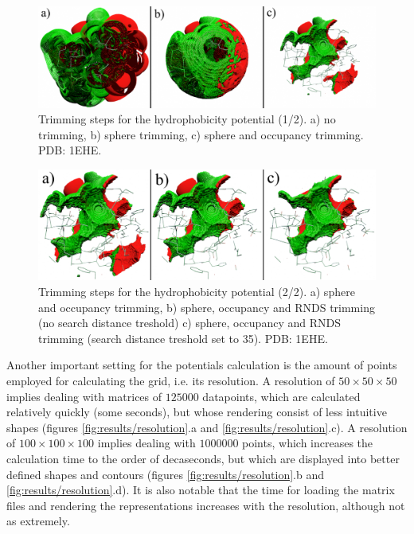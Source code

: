     \begin{figure}[H]
      \centering
      \includegraphics[width=1\textwidth]{figures/results/trimming_0.png}
      \caption{\label{fig:results/trimming_0} Trimming steps for the hydrophobicity potential (1/2). a) no trimming, b) sphere trimming, c) sphere and occupancy trimming. PDB: 1EHE.}
    \end{figure}

    \begin{figure}[H]
      \centering
      \includegraphics[width=1\textwidth]{figures/results/trimming_1.png}
      \caption{\label{fig:results/trimming_1} Trimming steps for the hydrophobicity potential (2/2). a) sphere and occupancy trimming, b) sphere, occupancy and RNDS trimming (no search distance treshold) c) sphere, occupancy and RNDS trimming (search distance treshold set to 35). PDB: 1EHE.}
    \end{figure}

    Another important setting for the potentials calculation is the amount of points employed for calculating the grid, i.e. its resolution. A resolution of $50 \times 50 \times 50$ implies dealing with matrices of $125000$ datapoints, which are calculated relatively quickly (some seconds), but whose rendering consist of less intuitive shapes (figures \ref{fig:results/resolution}.a and \ref{fig:results/resolution}.c). A resolution of $100 \times 100 \times 100$ implies dealing with $1000000$ points, which increases the calculation time to the order of decaseconds, but which are displayed into better defined shapes and contours (figures \ref{fig:results/resolution}.b and \ref{fig:results/resolution}.d). It is also notable that the time for loading the matrix files and rendering the representations increases with the resolution, although not as extremely.

